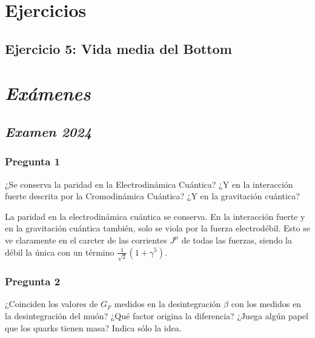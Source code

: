 
\newpage

\section*{Ejercicios}

\subsection*{Ejercicio 5: Vida media del Bottom}


\section*{\textit{Exámenes}}

\subsection*{\textit{Examen 2024}}

\begin{Enunciado}

	\subsubsection*{Pregunta 1}

	¿Se conserva la paridad en la Electrodinámica Cuántica? ¿Y en la interacción fuerte descrita por la Cromodinámica Cuántica? ¿Y en la gravitación cuántica?

\end{Enunciado}

La paridad en la electrodinámica cuántica se conserva. En la interacción fuerte y en la gravitación cuántica también, solo se viola por la fuerza electrodébil. Esto se ve claramente en el carcter de las corrientes $J^{\mu}$ de todas las fuerzas, siendo la débil la única con un término $\frac{1}{\sqrt{2}}(1+\gamma^5)$.


\vspace*{2em}

\begin{Enunciado}
	\subsubsection*{Pregunta 2}

	¿Coinciden los valores de $G_F$ medidos en la desintegración $\beta$ con los medidos en la desintegración del muón? ¿Qué factor origina la diferencia? ¿Juega algún papel que los quarks tienen masa? Indica sólo la idea.

\end{Enunciado}


